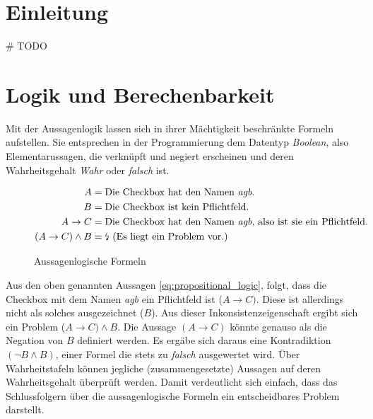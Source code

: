 \documentclass[runningheads,a4paper]{llncs}
\begin{document}
\section{Einleitung}
\# TODO
\newpage
\section{Logik und Berechenbarkeit}

Mit der Aussagenlogik lassen sich in ihrer Mächtigkeit beschränkte Formeln aufstellen. Sie entsprechen in der Programmierung dem Datentyp \textit{Boolean}, also Elementarussagen, die verknüpft und negiert erscheinen und deren Wahrheitsgehalt \textit{Wahr} oder \textit{falsch} ist.

\begin{figure}
\begin{align}
\begin{split}
A &= \textnormal{Die Checkbox hat den Namen \textit{agb}.}\\
B &= \textnormal{Die Checkbox ist kein Pflichtfeld.}\\
A \to C &= \textnormal{Die Checkbox hat den Namen \textit{agb}, also ist sie ein Pflichtfeld.}\\
(A \to C) \land B &= \textnormal{\lightning\ (Es liegt ein Problem vor.)}
\label{eq:propositional_logic}
\end{split}
\end{align}
\caption{Aussagenlogische Formeln}
\end{figure}
 
Aus den oben genannten Aussagen \eqref{eq:propositional_logic}, folgt, dass die Checkbox mit dem Namen \textit{agb} ein Pflichtfeld ist (\(A \to C)\). 
Diese ist allerdings nicht als solches ausgezeichnet (\(B\)). 
Aus dieser Inkonsistenzeigenschaft ergibt sich ein Problem (\(A \to C) \land B\). 
Die Aussage \((A \to C)\) könnte genauso als die Negation von \(B\) definiert werden. 
Es ergäbe sich daraus eine Kontradiktion \((\neg B \land B)\), einer Formel die stets zu \textit{falsch} ausgewertet wird. 
Über Wahrheitstafeln können jegliche (zusammengesetzte) Aussagen auf deren Wahrheitsgehalt überprüft werden. 
Damit verdeutlicht sich einfach, dass das Schlussfolgern über die aussagenlogische Formeln ein entscheidbares Problem darstellt.
\\
\end{document}

